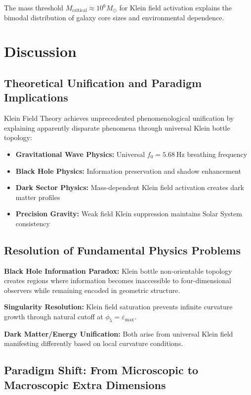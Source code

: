 \documentclass[12pt]{iopart}
\newcommand{\phifive}{\phi_5}
\newcommand{\epsmax}{\varepsilon_{\text{max}}}
\newcommand{\fzero}{f_0}
\newcommand{\msun}{M_{\odot}}
\begin{document}
The mass threshold $M_{\text{critical}} \approx 10^6 \msun$ for Klein field activation explains the bimodal distribution of galaxy core sizes and environmental dependence.

\section{Discussion}

\subsection{Theoretical Unification and Paradigm Implications}

Klein Field Theory achieves unprecedented phenomenological unification by explaining apparently disparate phenomena through universal Klein bottle topology:

\begin{itemize}
\item \textbf{Gravitational Wave Physics:} Universal $\fzero = \SI{5.68}{\hertz}$ breathing frequency
\item \textbf{Black Hole Physics:} Information preservation and shadow enhancement
\item \textbf{Dark Sector Physics:} Mass-dependent Klein field activation creates dark matter profiles
\item \textbf{Precision Gravity:} Weak field Klein suppression maintains Solar System consistency
\end{itemize}

\subsection{Resolution of Fundamental Physics Problems}

\textbf{Black Hole Information Paradox:} Klein bottle non-orientable topology creates regions where information becomes inaccessible to four-dimensional observers while remaining encoded in geometric structure.

\textbf{Singularity Resolution:} Klein field saturation prevents infinite curvature growth through natural cutoff at $\phifive = \epsmax$.

\textbf{Dark Matter/Energy Unification:} Both arise from universal Klein field manifesting differently based on local curvature conditions.

\subsection{Paradigm Shift: From Microscopic to Macroscopic Extra Dimensions}
\end{document}
